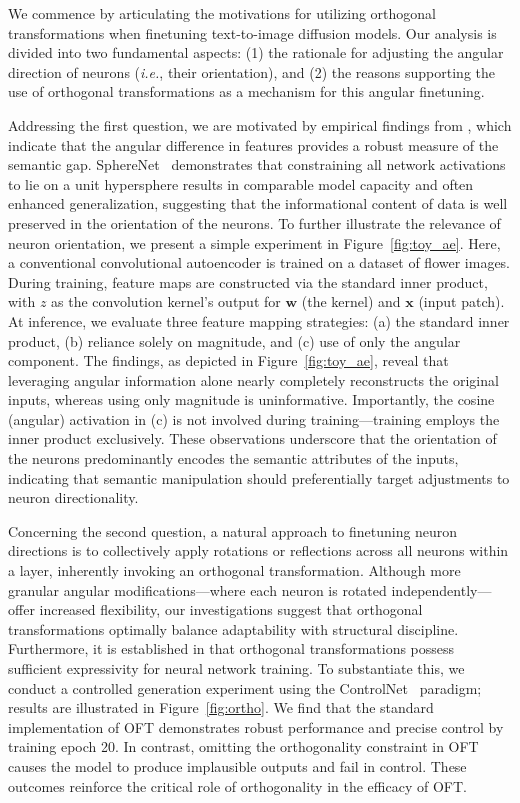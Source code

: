 We commence by articulating the motivations for utilizing orthogonal transformations when finetuning text-to-image diffusion models. Our analysis is divided into two fundamental aspects: (1) the rationale for adjusting the angular direction of neurons (\emph{i.e.}, their orientation), and (2) the reasons supporting the use of orthogonal transformations as a mechanism for this angular finetuning.

Addressing the first question, we are motivated by empirical findings from \cite{liu2018decoupled,chen2020angular}, which indicate that the angular difference in features provides a robust measure of the semantic gap. SphereNet~\cite{liu2017deep} demonstrates that constraining all network activations to lie on a unit hypersphere results in comparable model capacity and often enhanced generalization, suggesting that the informational content of data is well preserved in the orientation of the neurons. To further illustrate the relevance of neuron orientation, we present a simple experiment in Figure~\ref{fig:toy_ae}. Here, a conventional convolutional autoencoder is trained on a dataset of flower images. During training, feature maps are constructed via the standard inner product, with $z$ as the convolution kernel’s output for $\bm{w}$ (the kernel) and $\bm{x}$ (input patch). At inference, we evaluate three feature mapping strategies: (a) the standard inner product, (b) reliance solely on magnitude, and (c) use of only the angular component. The findings, as depicted in Figure~\ref{fig:toy_ae}, reveal that leveraging angular information alone nearly completely reconstructs the original inputs, whereas using only magnitude is uninformative. Importantly, the cosine (angular) activation in (c) is not involved during training—training employs the inner product exclusively. These observations underscore that the orientation of the neurons predominantly encodes the semantic attributes of the inputs, indicating that semantic manipulation should preferentially target adjustments to neuron directionality.

Concerning the second question, a natural approach to finetuning neuron directions is to collectively apply rotations or reflections across all neurons within a layer, inherently invoking an orthogonal transformation. Although more granular angular modifications—where each neuron is rotated independently—offer increased flexibility, our investigations suggest that orthogonal transformations optimally balance adaptability with structural discipline. Furthermore, it is established in \cite{liu2021orthogonal} that orthogonal transformations possess sufficient expressivity for neural network training. To substantiate this, we conduct a controlled generation experiment using the ControlNet~\cite{zhang2023adding} paradigm; results are illustrated in Figure~\ref{fig:ortho}. We find that the standard implementation of OFT demonstrates robust performance and precise control by training epoch 20. In contrast, omitting the orthogonality constraint in OFT causes the model to produce implausible outputs and fail in control. These outcomes reinforce the critical role of orthogonality in the efficacy of OFT.

